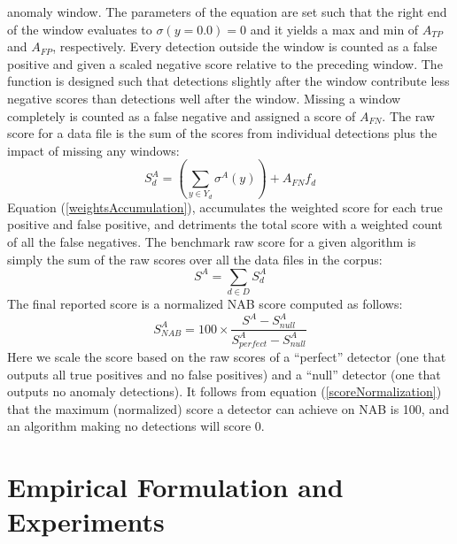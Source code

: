 \documentclass[12pt]{article}
\begin{document}
anomaly window. The parameters of the equation are set such that
the right end of the window evaluates to $\sigma(y = 0.0) = 0$ and it yields a max and min of $A_{TP}$ and $A_{FP}$, respectively. Every detection outside the window is counted as
a false positive and given a scaled negative score relative to the
preceding window. The function is designed such that
detections slightly after the window contribute less negative
scores than detections well after the window. Missing a
window completely is counted as a false negative and assigned
a score of $A_{FN}$. The raw score for a data file is the sum of the scores from
individual detections plus the impact of missing any windows:
\begin{equation}
S^A_d = (\sum_{y \in Y_d} \sigma^A(y)) + A_{FN}f_d
\label{weightsAccumulation}
\end{equation}
Equation (\ref{weightsAccumulation}), accumulates the weighted score for each true positive
and false positive, and detriments the total score with a
weighted count of all the false negatives. The benchmark raw score for a given algorithm is simply the sum of the raw scores
over all the data files in the corpus:
\begin{equation}
S^A = \sum_{d \in D} S^A_d
\label{allScore}
\end{equation}
The final reported score is a normalized NAB score computed as follows:
\begin{equation}
S^A_{NAB} = 100 \times \frac{S^A - S^A_{null}}{S^A_{perfect} - S^A_{null}}
\label{scoreNormalization}
\end{equation}
Here we scale the score based on the raw scores of a “perfect”
detector (one that outputs all true positives and no false
positives) and a “null” detector (one that outputs no anomaly
detections). It follows from equation (\ref{scoreNormalization}) that the maximum (normalized) score a detector can achieve on NAB is 100, and an algorithm making no detections will score 0.
\newpage 
\section{Empirical Formulation and Experiments}
\end{document}
